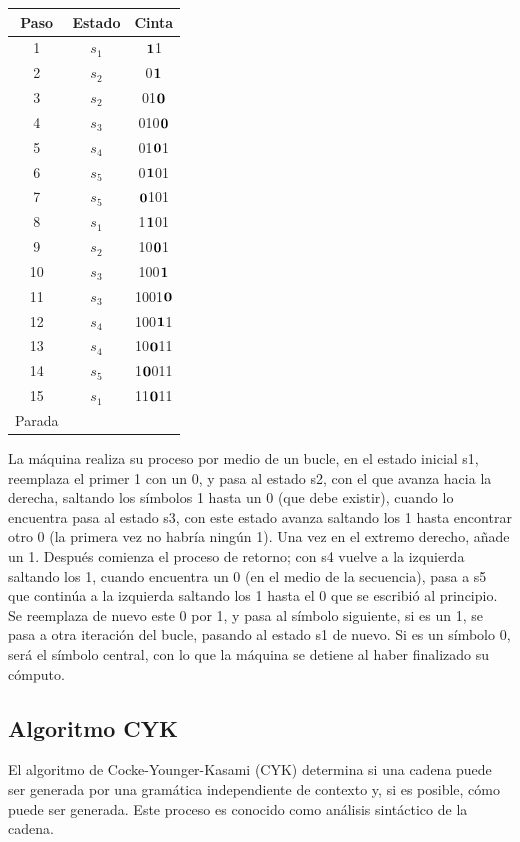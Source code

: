 \documentclass[12pt,a4paper,spanish]{book}
\begin{document}
\begin{itemize}
\begin{center}
\begin{tabular}{||c|c|c||}
\hline
Paso & Estado & Cinta\\
\hline
1 & $s_{1}$ & $\bf{1}$1\\
\hline
2 & $s_{2}$ & 0$\bf{1}$\\
\hline
3 & $s_{2}$ & 01$\bf{0}$\\
\hline
4 & $s_{3}$ & 010$\bf{0}$\\
\hline
5 & $s_{4}$ & 01$\bf{0}$1\\
\hline
6 & $s_{5}$ & 0$\bf{1}$01\\
\hline
7 & $s_{5}$ & $\bf{0}$101\\
\hline
8 & $s_{1}$ & 1$\bf{1}$01\\
\hline
9 & $s_{2}$ & 10$\bf{0}$1\\
\hline
10 & $s_{3}$ & 100$\bf{1}$\\
\hline
11 & $s_{3}$ & 1001$\bf{0}$\\
\hline
12 & $s_{4}$ & 100$\bf{1}$1\\
\hline
13 & $s_{4}$ & 10$\bf{0}$11\\
\hline
14 & $s_{5}$ & 1$\bf{0}$011\\
\hline
15 & $s_{1}$ & 11$\bf{0}$11\\
\hline
Parada & &\\
\hline
\end{tabular}
\end{center}
\newpage
La m\'aquina realiza su proceso por medio de un bucle, en el estado inicial s1, reemplaza el primer 1 con un 0, y pasa al estado s2, con el que avanza hacia la derecha, saltando los s\'imbolos 1 hasta un 0 (que debe existir), cuando lo encuentra pasa al estado s3, con este estado avanza saltando los 1 hasta encontrar otro 0 (la primera vez no habr\'ia ning\'un 1). Una vez en el extremo derecho, a\~nade un 1. Despu\'es comienza el proceso de retorno; con s4 vuelve a la izquierda saltando los 1, cuando encuentra un 0 (en el medio de la secuencia), pasa a s5 que contin\'ua a la izquierda saltando los 1 hasta el 0 que se escribi\'o al principio. Se reemplaza de nuevo este 0 por 1, y pasa al s\'imbolo siguiente, si es un 1, se pasa a otra iteraci\'on del bucle, pasando al estado s1 de nuevo. Si es un s\'imbolo 0, ser\'a el s\'imbolo central, con lo que la m\'aquina se detiene al haber finalizado su c\'omputo.
\end{itemize}
\subsection{Algoritmo CYK}
El algoritmo de Cocke-Younger-Kasami (CYK) determina si una cadena puede ser generada por una gram\'atica independiente de contexto y, si es posible, c\'omo puede ser generada. Este proceso es conocido como an\'alisis sintáctico de la cadena. 
\end{document}
